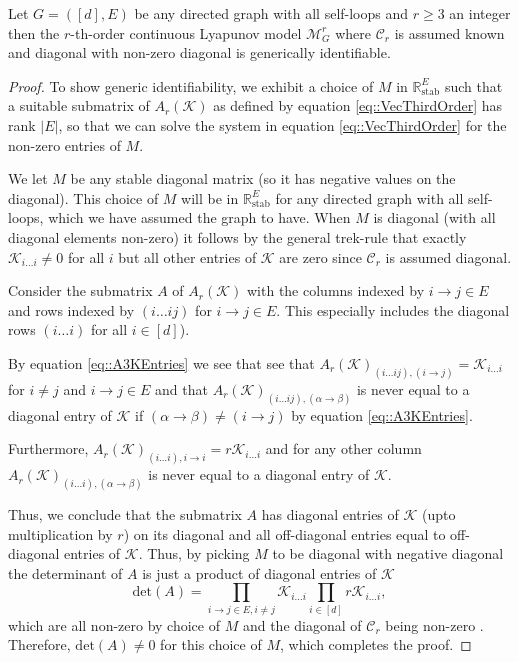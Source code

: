 \documentclass{biometrika}
\begin{document}
\begin{proposition}
    \label{prop::ThirdOrderID}
    Let $G = ([d], E)$  be any directed graph with all self-loops and $r \geq 3$ an integer then the $r$-th-order continuous Lyapunov model $\mathcal{M}^r_{G}$ where $\mathcal{C}_r$ is assumed known and diagonal with non-zero diagonal is generically identifiable. 
\end{proposition}
\begin{proof}
    To show generic identifiability, we exhibit a choice of $M$ in $\mathbb{R}^{E}_{\mathrm{stab}}$ such that a suitable submatrix of $A_r(\mathcal{K} )$ as defined by equation \eqref{eq::VecThirdOrder} has rank $|E|$, so that we can solve the system in equation \eqref{eq::VecThirdOrder} for the non-zero entries of $M$.

    We let $M$ be any stable diagonal matrix (so it has negative values on the diagonal). This choice of $M$ will be in $\mathbb{R}^{E}_{\mathrm{stab}}$ for any directed graph with all self-loops, which we have assumed the graph to have. When $M$ is diagonal (with all diagonal elements non-zero) it follows by the general trek-rule that exactly $\mathcal{K} _{i \dots i} \neq 0$ for all $i$ but all other entries of $\mathcal{K} $ are zero since $\mathcal{C}_r$ is assumed diagonal.  

    Consider the submatrix $A$ of $A_r(\mathcal{K} )$ with the columns indexed by $i \rightarrow j \in E$ 
    and rows indexed by  $(i \dots i j)$ for $i \rightarrow j \in E$. This especially includes the diagonal rows $(i \dots i)$ for all $i \in [d]$). 

    By equation \eqref{eq::A3KEntries} we see that see that 
    $A_r(\mathcal{K} )_{(i \dots ij), (i \rightarrow j)} = \mathcal{K} _{i \dots i}$ for $i \neq j$ and $i \rightarrow j \in E$ and that $A_r(\mathcal{K} )_{(i \dots ij), (\alpha \rightarrow \beta)}$ is never equal to a diagonal entry of $\mathcal{K} $ if $(\alpha \rightarrow \beta) \neq (i \rightarrow j)$ by equation \eqref{eq::A3KEntries}. 
    
    Furthermore, $A_r(\mathcal{K} )_{(i \dots i), i \rightarrow i} = r \mathcal{K} _{i \dots i}$ and for any other column $A_r(\mathcal{K} )_{(i \dots i), (\alpha \rightarrow \beta)}$ is never equal to a diagonal entry of $\mathcal{K} $.
    
    Thus, we conclude that the submatrix $A$ has diagonal entries of $\mathcal{K} $ (upto multiplication by $r$) on its diagonal and all off-diagonal entries equal to off-diagonal entries of $\mathcal{K} $. Thus, by picking $M$ to be diagonal with negative diagonal the determinant of $A$ is just a product of diagonal entries of $\mathcal{K} $
    \begin{equation*}
        \mathrm{det}(A) = \prod_{i \rightarrow j \in E, i \neq j} \mathcal{K} _{i \dots i} \prod_{i \in [d]} r \mathcal{K} _{i \dots i},
    \end{equation*}
    which are all non-zero by choice of $M$ and the diagonal of $\mathcal{C}_r$ being non-zero . Therefore, $\mathrm{det}(A) \neq 0$ for this choice of $M$, which completes the proof.   
\end{proof}
\end{document}
